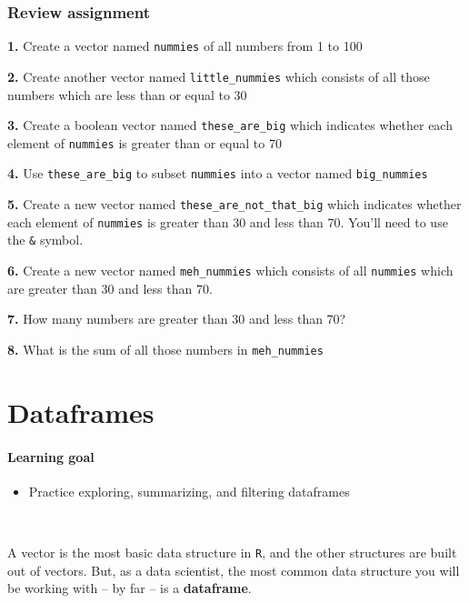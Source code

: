 \documentclass[
]{book}
\providecommand{\tightlist}{%
  \setlength{\itemsep}{0pt}\setlength{\parskip}{0pt}}
\begin{document}
\hypertarget{review-assignment}{%
\subsection*{Review assignment}\label{review-assignment}}

\textbf{1.} Create a vector named \texttt{nummies} of all numbers from 1 to 100

\textbf{2.} Create another vector named \texttt{little\_nummies} which consists of all those numbers which are less than or equal to 30

\textbf{3.} Create a boolean vector named \texttt{these\_are\_big} which indicates whether each element of \texttt{nummies} is greater than or equal to 70

\textbf{4.} Use \texttt{these\_are\_big} to subset \texttt{nummies} into a vector named \texttt{big\_nummies}

\textbf{5.} Create a new vector named \texttt{these\_are\_not\_that\_big} which indicates whether each element of \texttt{nummies} is greater than 30 and less than 70. You'll need to use the \texttt{\&} symbol.

\textbf{6.} Create a new vector named \texttt{meh\_nummies} which consists of all \texttt{nummies} which are greater than 30 and less than 70.

\textbf{7.} How many numbers are greater than 30 and less than 70?

\textbf{8.} What is the sum of all those numbers in \texttt{meh\_nummies}

\hypertarget{dataframes}{%
\chapter{Dataframes}\label{dataframes}}

\hypertarget{learning-goal}{%
\subsubsection*{Learning goal}\label{learning-goal}}

\begin{itemize}
\tightlist
\item
  Practice exploring, summarizing, and filtering dataframes
\end{itemize}

~

A vector is the most basic data structure in \texttt{R}, and the other structures are built out of vectors. But, as a data scientist, the most common data structure you will be working with -- by far -- is a \textbf{dataframe}.
\end{document}
